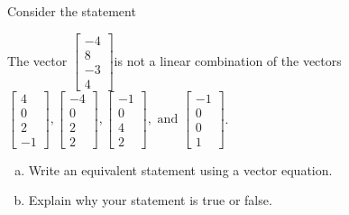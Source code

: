 
\begin{exerciseStatement}


Consider the statement 
\begin{center}\begin{minipage}{0.8\textwidth}
 The vector \( \left[\begin{array}{c}
-4 \\
8 \\
-3 \\
4
\end{array}\right] \)is not a linear combination of the vectors \( \left[\begin{array}{c}
4 \\
0 \\
2 \\
-1
\end{array}\right] , \left[\begin{array}{c}
-4 \\
0 \\
2 \\
2
\end{array}\right] , \left[\begin{array}{c}
-1 \\
0 \\
4 \\
2
\end{array}\right] , \text{ and } \left[\begin{array}{c}
-1 \\
0 \\
0 \\
1
\end{array}\right] \). 
\end{minipage}\end{center}
    


\begin{enumerate}[(a)]
\item  Write an equivalent statement using a vector equation.
\item  Explain why your statement is true or false.
\end{enumerate}
    
\end{exerciseStatement}
    
